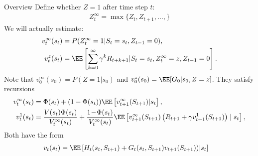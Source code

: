 \begin{frame}{Overview}
Define whether $Z=1$ after time step $t$:
\begin{align*}
	Z_t^\infty = \max\{Z_t,Z_{t+1}, \dots,\} %
\end{align*}  \pause
We will actually estimate:
\begin{align*}
	v^{\infty}_t(s_t) & = P(Z^\infty_t =1 | S_t=s_t, Z_{t-1} = 0), \\
	v^{z}_t(s_t) & = \EE\left[\sum_{k=0}^\infty \gamma^{k}R_{t+k+1} | S_t=s_t, Z_t^\infty = z, Z_{t-1} = 0\right].  %
\end{align*}
Note that $v^\infty_0(s_0) = P(Z = 1| s_0)$ and $v^z_0(s_0) = \EE[G_0 | s_0, Z=z]$. \pause
They satisfy recursions
\begin{subequations} 
\begin{align*}
		v^\infty_t(s_t) & = \Phi(s_t) + (1-\Phi(s_t) ) \EE\left[ v^\infty_{t+1}(S_{t+1} )| s_t\right],  \\ 
		v^{1}_t(s_t) & =  \frac{ V(s_t) \Phi(s_t) }{V_t^\infty(s_t) }  
		+ \frac{  1\!-\! \Phi(s_t)  }{V_t^\infty(s_t) } \EE\left[ v^\infty_{t+1}(S_{t+1}) \left( R_{t+1} + \gamma v^{1}_{t+1}(S_{t+1} ) \right) \mid s_t   \right], \nonumber \\	
\end{align*}
\end{subequations}
Both have the form
\begin{align*}
	v_t(s_t) & =\EE\left[H_t(s_t,S_{t+1})  + G_t(s_t, S_{t+1}) v_{t+1}(S_{t+1} )  )  \middle| s_t\right] %
\end{align*}\end{frame}

